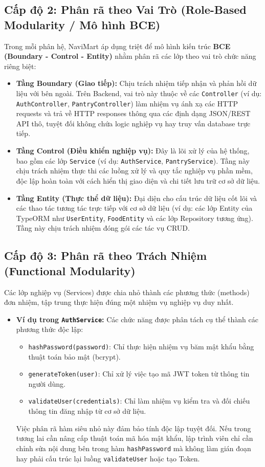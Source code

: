 \documentclass[12pt,a4paper]{article}
\begin{document}
\subsection{Cấp độ 2: Phân rã theo Vai Trò (Role-Based Modularity / Mô hình BCE)}
Trong mỗi phân hệ, NaviMart áp dụng triệt để mô hình kiến trúc \textbf{BCE (Boundary - Control - Entity)} nhằm phân rã các lớp theo vai trò chức năng riêng biệt:
\begin{itemize}
    \item \textbf{Tầng Boundary (Giao tiếp):} Chịu trách nhiệm tiếp nhận và phản hồi dữ liệu với bên ngoài. Trên Backend, vai trò này thuộc về các \texttt{Controller} (ví dụ: \texttt{AuthController}, \texttt{PantryController}) làm nhiệm vụ ánh xạ các HTTP requests và trả về HTTP responses thông qua các định dạng JSON/REST API thô, tuyệt đối không chứa logic nghiệp vụ hay truy vấn database trực tiếp.
    \item \textbf{Tầng Control (Điều khiển nghiệp vụ):} Đây là lõi xử lý của hệ thống, bao gồm các lớp \texttt{Service} (ví dụ: \texttt{AuthService}, \texttt{PantryService}). Tầng này chịu trách nhiệm thực thi các luồng xử lý và quy tắc nghiệp vụ phần mềm, độc lập hoàn toàn với cách hiển thị giao diện và chi tiết lưu trữ cơ sở dữ liệu.
    \item \textbf{Tầng Entity (Thực thể dữ liệu):} Đại diện cho cấu trúc dữ liệu cốt lõi và các thao tác tương tác trực tiếp với cơ sở dữ liệu (ví dụ: các lớp Entity của TypeORM như \texttt{UserEntity}, \texttt{FoodEntity} và các lớp Repository tương ứng). Tầng này chịu trách nhiệm đóng gói các tác vụ CRUD.
\end{itemize}

\subsection{Cấp độ 3: Phân rã theo Trách Nhiệm (Functional Modularity)}
Các lớp nghiệp vụ (Services) được chia nhỏ thành các phương thức (methods) đơn nhiệm, tập trung thực hiện đúng một nhiệm vụ nghiệp vụ duy nhất.
\begin{itemize}
    \item \textbf{Ví dụ trong \texttt{AuthService}:}
    Các chức năng được phân tách cụ thể thành các phương thức độc lập:
    \begin{itemize}
        \item \texttt{hashPassword(password)}: Chỉ thực hiện nhiệm vụ băm mật khẩu bằng thuật toán bảo mật (bcrypt).
        \item \texttt{generateToken(user)}: Chỉ xử lý việc tạo mã JWT token từ thông tin người dùng.
        \item \texttt{validateUser(credentials)}: Chỉ làm nhiệm vụ kiểm tra và đối chiếu thông tin đăng nhập từ cơ sở dữ liệu.
    \end{itemize}
    Việc phân rã hàm siêu nhỏ này đảm bảo tính độc lập tuyệt đối. Nếu trong tương lai cần nâng cấp thuật toán mã hóa mật khẩu, lập trình viên chỉ cần chỉnh sửa nội dung bên trong hàm \texttt{hashPassword} mà không làm gián đoạn hay phải cấu trúc lại luồng \texttt{validateUser} hoặc tạo Token.
\end{itemize}
\end{document}
